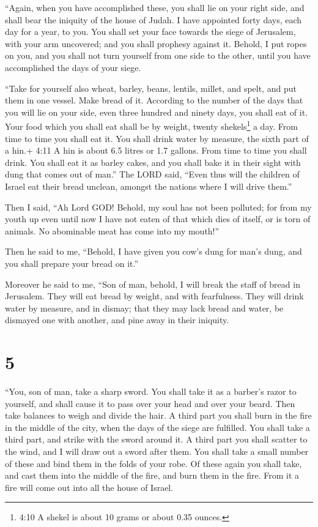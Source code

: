  ``Again, when you have accomplished these, you shall lie on
your right side, and shall bear the iniquity of the house of Judah. I
have appointed forty days, each day for a year, to you.  You
shall set your face towards the siege of Jerusalem, with your arm
uncovered; and you shall prophesy against it.  Behold, I put
ropes on you, and you shall not turn yourself from one side to the
other, until you have accomplished the days of your siege.

 ``Take for yourself also wheat, barley, beans, lentils,
millet, and spelt, and put them in one vessel. Make bread of it.
According to the number of the days that you will lie on your side, even
three hundred and ninety days, you shall eat of it.  Your
food which you shall eat shall be by weight, twenty shekels\footnote{4:10
  A shekel is about 10 grams or about 0.35 ounces.} a day. From time to
time you shall eat it.  You shall drink water by measure,
the sixth part of a hin.+ 4:11 A hin is about 6.5 litres or 1.7 gallons.
From time to time you shall drink.  You shall eat it as
barley cakes, and you shall bake it in their sight with dung that comes
out of man.''  The LORD said, ``Even thus will the children
of Israel eat their bread unclean, amongst the nations where I will
drive them.''

 Then I said, ``Ah Lord GOD! Behold, my soul has not been
polluted; for from my youth up even until now I have not eaten of that
which dies of itself, or is torn of animals. No abominable meat has come
into my mouth!''

 Then he said to me, ``Behold, I have given you cow's dung
for man's dung, and you shall prepare your bread on it.''

 Moreover he said to me, ``Son of man, behold, I will break
the staff of bread in Jerusalem. They will eat bread by weight, and with
fearfulness. They will drink water by measure, and in dismay;
 that they may lack bread and water, be dismayed one with
another, and pine away in their iniquity.

\hypertarget{section-4}{%
\section{5}\label{section-4}}

 ``You, son of man, take a sharp sword. You shall take it as
a barber's razor to yourself, and shall cause it to pass over your head
and over your beard. Then take balances to weigh and divide the hair.
 A third part you shall burn in the fire in the middle of
the city, when the days of the siege are fulfilled. You shall take a
third part, and strike with the sword around it. A third part you shall
scatter to the wind, and I will draw out a sword after them.
 You shall take a small number of these and bind them in the
folds of your robe.  Of these again you shall take, and cast
them into the middle of the fire, and burn them in the fire. From it a
fire will come out into all the house of Israel.

